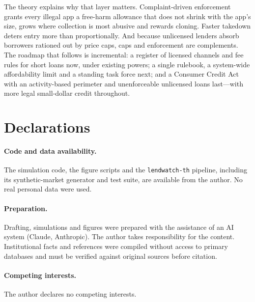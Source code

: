 \documentclass[11pt]{article}
\theoremstyle{plain}
\theoremstyle{definition}
\theoremstyle{remark}
\begin{document}
The theory explains why that layer matters. Complaint-driven enforcement grants every illegal app a free-harm allowance that does not shrink with the app's size, grows where collection is most abusive and rewards cloning. Faster takedown deters entry more than proportionally. And because unlicensed lenders absorb borrowers rationed out by price caps, caps and enforcement are complements. The roadmap that follows is incremental: a register of licensed channels and fee rules for short loans now, under existing powers; a single rulebook, a system-wide affordability limit and a standing task force next; and a Consumer Credit Act with an activity-based perimeter and unenforceable unlicensed loans last---with more legal small-dollar credit throughout.

\section*{Declarations}

\paragraph{Code and data availability.} The simulation code, the figure scripts and the \texttt{lendwatch-th} pipeline, including its synthetic-market generator and test suite, are available from the author. No real personal data were used.

\paragraph{Preparation.} Drafting, simulations and figures were prepared with the assistance of an AI system (Claude, Anthropic). The author takes responsibility for the content. Institutional facts and references were compiled without access to primary databases and must be verified against original sources before citation.

\paragraph{Competing interests.} The author declares no competing interests.
\end{document}

